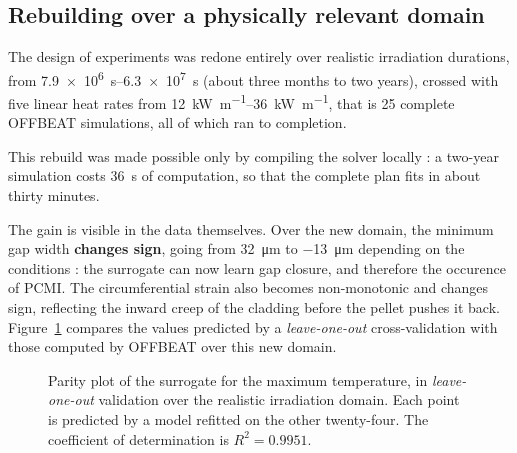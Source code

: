 \documentclass[12pt,a4paper]{report}
\begin{document}
\subsection{Rebuilding over a physically relevant domain}

The design of experiments was redone entirely over realistic irradiation
durations, from \SIrange{7.9e6}{6.3e7}{\second} (about three months to two
years), crossed with five linear heat rates from
\SIrange{12}{36}{\kilo\watt\per\metre}, that is \num{25} complete OFFBEAT
simulations, all of which ran to completion.

This rebuild was made possible only by compiling the solver locally : a two-year
simulation costs \SI{36}{\second} of computation, so that the complete plan fits
in about thirty minutes.

The gain is visible in the data themselves. Over the new domain, the minimum gap
width \textbf{changes sign}, going from \SI{+32}{\micro\metre} to
\SI{-13}{\micro\metre} depending on the conditions : the surrogate can now learn
gap closure, and therefore the occurence of PCMI. The circumferential strain also
becomes non-monotonic and changes sign, reflecting the inward creep of the
cladding before the pellet pushes it back. Figure~\ref{fig:parite} compares the values predicted by a \textit{leave-one-out}
cross-validation with those computed by OFFBEAT over this new domain.

\begin{figure}[htbp]
\centering
{}
\caption[Surrogate parity plot]{Parity plot of the surrogate for the maximum
temperature, in \textit{leave-one-out} validation over the realistic irradiation
domain. Each point is predicted by a model refitted on the other twenty-four.
The coefficient of determination is $R^2 = 0.9951$.}
\label{fig:parite}
\end{figure}
\end{document}
